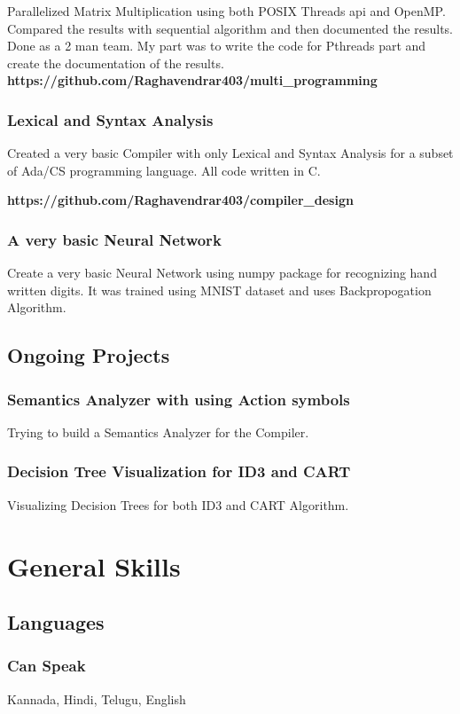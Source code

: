 \documentclass{article}
\begin{document}
Parallelized Matrix Multiplication using both POSIX Threads api and OpenMP. Compared the results with sequential algorithm 
and then documented the results. Done as a 2 man team. My part was to write the code for Pthreads part and create the documentation
of the results. 
\textbf{https://github.com/Raghavendrar403/multi\_programming}

\subsubsection{Lexical and Syntax Analysis}
Created a very basic Compiler with only Lexical and Syntax Analysis for a subset of Ada/CS programming language. All code written in C.

\textbf{https://github.com/Raghavendrar403/compiler\_design}

\subsubsection{A very basic Neural Network}
Create a very basic Neural Network using numpy package for recognizing hand written digits. It was trained using MNIST dataset and uses Backpropogation Algorithm.

\subsection{Ongoing Projects}
\subsubsection{Semantics Analyzer with using Action symbols}
Trying to build a Semantics Analyzer for the Compiler.

\subsubsection{Decision Tree Visualization for ID3 and CART}
Visualizing Decision Trees for both ID3 and CART Algorithm.

\section{General Skills}
\subsection{Languages}
\subsubsection{Can Speak} 
Kannada, Hindi, Telugu, English
\end{document}
